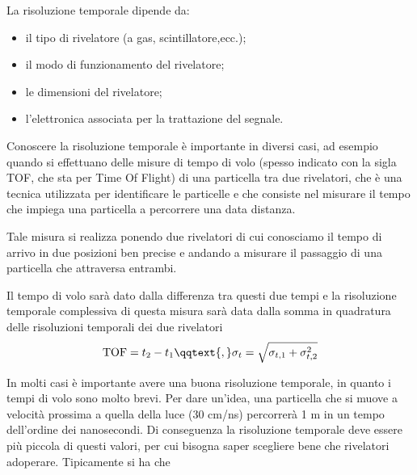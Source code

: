 La risoluzione temporale dipende da:

\begin{itemize}
   \item il tipo di rivelatore (a gas, scintillatore,ecc.);
   \item il modo di funzionamento del rivelatore;
   \item le dimensioni del rivelatore;
   \item l'elettronica associata per la trattazione del segnale.
\end{itemize}

\begin{esempio}
   Conoscere la risoluzione temporale è importante in diversi casi, ad esempio quando si effettuano delle misure di tempo di volo (spesso indicato con la sigla TOF, che sta per Time Of Flight) di una particella tra due rivelatori, che è una tecnica utilizzata per identificare le particelle e che consiste nel misurare il tempo che impiega una particella a percorrere una data distanza.

   Tale misura si realizza ponendo due rivelatori di cui conosciamo il tempo di arrivo in due posizioni ben precise e andando a misurare il passaggio di una particella che attraversa entrambi.
   \begin{figure}[H]
      \centering
   \end{figure}
   Il tempo di volo sarà dato dalla differenza tra questi due tempi e la risoluzione temporale complessiva di questa misura sarà data dalla somma in quadratura delle risoluzioni temporali dei due rivelatori
   \begin{equation*}
      \text{TOF}=t_2 - t_1
      \qqtext{,}
      \sigma_t=\sqrt{\sigma_{t,1} + \sigma_{t,2}^2}
   \end{equation*}
\end{esempio}

In molti casi è importante avere una buona risoluzione temporale, in quanto i tempi di volo sono molto brevi. Per dare un'idea, una particella che si muove a velocità prossima a quella della luce (30 cm/ns) percorrerà 1 m in un tempo dell'ordine dei nanosecondi. Di conseguenza la risoluzione temporale deve essere più piccola di questi valori, per cui bisogna saper scegliere bene che rivelatori adoperare. Tipicamente si ha che

